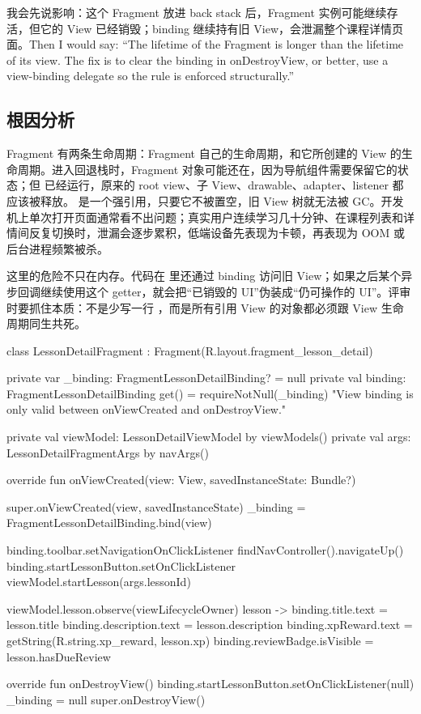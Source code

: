 \begin{sayit}[面试里怎么说]
我会先说影响：这个 Fragment 放进 back stack 后，Fragment 实例可能继续存活，但它的 View 已经销毁；binding 继续持有旧 View，会泄漏整个课程详情页面。Then I would say: ``The lifetime of the Fragment is longer than the lifetime of its view. The fix is to clear the binding in onDestroyView, or better, use a view-binding delegate so the rule is enforced structurally.''
\end{sayit}

\subsection*{根因分析}
Fragment 有两条生命周期：Fragment 自己的生命周期，和它所创建的 View 的生命周期。进入回退栈时，Fragment 对象可能还在，因为导航组件需要保留它的状态；但  已经运行，原来的 root view、子 View、drawable、adapter、listener 都应该被释放。 是一个强引用，只要它不被置空，旧 View 树就无法被 GC。开发机上单次打开页面通常看不出问题；真实用户连续学习几十分钟、在课程列表和详情间反复切换时，泄漏会逐步累积，低端设备先表现为卡顿，再表现为 OOM 或后台进程频繁被杀。

这里的危险不只在内存。代码在  里还通过 binding 访问旧 View；如果之后某个异步回调继续使用这个 getter，就会把“已销毁的 UI”伪装成“仍可操作的 UI”。评审时要抓住本质：不是少写一行 ，而是所有引用 View 的对象都必须跟 View 生命周期同生共死。

\begin{ktfix}
class LessonDetailFragment : Fragment(R.layout.fragment_lesson_detail) {
    private var _binding: FragmentLessonDetailBinding? = null
    private val binding: FragmentLessonDetailBinding
        get() = requireNotNull(_binding) { "View binding is only valid between onViewCreated and onDestroyView." }

    private val viewModel: LessonDetailViewModel by viewModels()
    private val args: LessonDetailFragmentArgs by navArgs()

    override fun onViewCreated(view: View, savedInstanceState: Bundle?) {
        super.onViewCreated(view, savedInstanceState)
        _binding = FragmentLessonDetailBinding.bind(view)

        binding.toolbar.setNavigationOnClickListener {
            findNavController().navigateUp()
        }
        binding.startLessonButton.setOnClickListener {
            viewModel.startLesson(args.lessonId)
        }

        viewModel.lesson.observe(viewLifecycleOwner) { lesson ->
            binding.title.text = lesson.title
            binding.description.text = lesson.description
            binding.xpReward.text = getString(R.string.xp_reward, lesson.xp)
            binding.reviewBadge.isVisible = lesson.hasDueReview
        }
    }

    override fun onDestroyView() {
        binding.startLessonButton.setOnClickListener(null)
        _binding = null
        super.onDestroyView()
    }
}
\end{ktfix}


